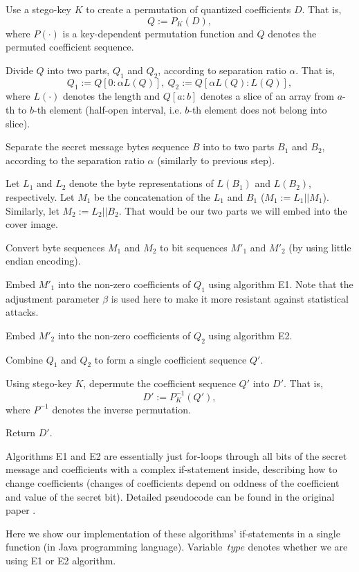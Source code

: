 \begin{Algo}
\item 
Use a stego-key $K$ to create a permutation of quantized coefficients $D$.
That is, $$Q := P_K(D),$$ where $P(\cdot)$ is a key-dependent
permutation function and $Q$ denotes the permuted coefficient sequence.
\item
Divide $Q$ into two parts, $Q_1$ and $Q_2$, according to separation ratio $\alpha$.
That is, $$Q_1 := Q[0 : \alpha L(Q)],~ Q_2 := Q[\alpha L(Q) : L(Q)],$$
where $L(\cdot)$ denotes the length and $Q[a : b]$ denotes a slice of an array from 
$a$-th to $b$-th element (half-open interval, i.e. $b$-th element does not belong into slice).
\item 
Separate the secret message bytes sequence $B$ into to two parts $B_1$ and $B_2$, 
according to the separation ratio $\alpha$ (similarly to previous step).
\item
Let $L_1$ and $L_2$ denote the byte representations of $L(B_1)$ and $L(B_2)$, respectively.
Let $M_1$ be the concatenation of the $L_1$ and $B_1$ ($M_1 := L_1 || M_1$). Similarly, let
$M_2 := L_2 || B_2$. That would be our two parts we will embed into the cover image.
\item
Convert byte sequences $M_1$ and $M_2$ to bit sequences $M'_1$ and $M'_2$ (by using little endian
encoding).
\item
Embed $M'_1$ into the non-zero coefficients of $Q_1$ using algorithm E1. Note that
the adjustment parameter $\beta$ is used here to make it more resistant against statistical attacks.
\item
Embed $M'_2$ into the non-zero coefficients of $Q_2$ using algorithm E2.
\item
Combine $Q_1$ and $Q_2$ to form a single coefficient sequence $Q'$.
\item 
Using stego-key $K$, depermute the coefficient sequence $Q'$ into $D'$. That is,
$$D' := P^{-1}_K(Q'),$$ where $P^{-1}$ denotes the inverse permutation.
\item 
Return $D'$.
\end{Algo}

Algorithms E1 and E2 are essentially just for-loops through all bits of the secret message
and coefficients with a complex if-statement inside, describing how to change coefficients
(changes of coefficients depend on oddness of the coefficient and
value of the secret bit). Detailed pseudocode can be found in the original paper \cite{liu2008high}.

Here we show our implementation of these algorithms' if-statements 
in a single function (in Java programming language). 
Variable~$type$ denotes whether we are using E1 or E2 algorithm.

